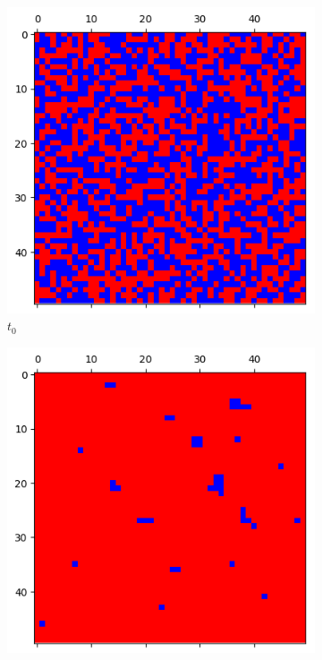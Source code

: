 \documentclass[letterpaper]{article}
\begin{document}
\begin{figure}[H]
    \begin{subfigure}{.33\textwidth}
      \centering
      \includegraphics[width=1\linewidth]{images/assign2/visu_50-part1/t0}
      \caption{$t_0$}
      \label{fig:t0_50part1}
    \end{subfigure}
    \begin{subfigure}{.33\textwidth}
      \centering
      \includegraphics[width=1\linewidth]{images/assign2/visu_50-part1/t1}

\end{subfigure}
\end{figure}
\end{document}
